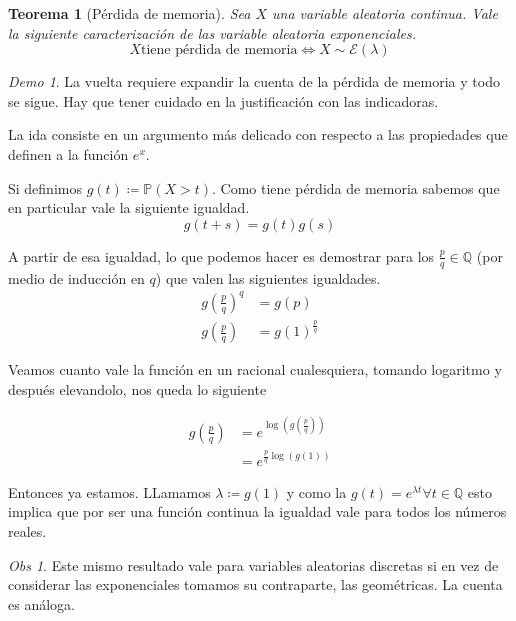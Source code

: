 \documentclass[11pt]{article}
\theoremstyle{plain} %
\newtheorem{teorema}{Teorema}
\theoremstyle{definition}
\theoremstyle{remark}
\newtheorem{obs}{Obs}
\newtheorem*{demo}{Demo}
\def\Q{\mathbb{Q}}
\def\P{\mathbb{P}}
\def\va{variable aleatoria }
\def\vas{variables aleatorias }
\renewcommand\qed{\ding{110}}
\begin{document}
\begin{teorema}
	[P\'erdida de memoria]
	Sea $X$ una \va continua. Vale la siguiente caracterizaci\'on de las \va exponenciales.
	\[X \text{tiene p\'erdida de memoria} \iff X \sim \mathcal{E}(\lambda) \]
\end{teorema}

\begin{demo}
	
	La vuelta requiere expandir la cuenta de la p\'erdida de memoria y todo se sigue. Hay que tener cuidado en la justificaci\'on con las indicadoras.
	
	La ida consiste en un argumento m\'as delicado con respecto a las propiedades que definen a la funci\'on $e^x$. 
	
	Si definimos $g(t) \coloneqq \P(X>t) $. Como tiene p\'erdida de memoria sabemos que en particular vale la siguiente igualdad.
	\[g(t+s) = g(t)g(s)\]
	
	A partir de esa igualdad, lo que podemos hacer es demostrar para los $\frac{p}{q} \in \Q$ (por medio de inducci\'on en $q$) que valen las siguientes igualdades.
	\begin{align*}
		g(\frac{p}{q})^q &= g(p) \\
		g(\frac{p}{q}) &= g(1)^{\frac{p}{q}}
	\end{align*} 
	
	Veamos cuanto vale la funci\'on en un racional cualesquiera, tomando logaritmo y despu\'es elevandolo, nos queda lo siguiente
	
	\begin{align*}
		g(\frac{p}{q}) &= e^{\log(g(\frac{p}{q}))} \\
		&= e^{\frac{p}{q} \log(g(1))} 
	\end{align*}
	
	Entonces ya estamos. LLamamos $\lambda \coloneqq g(1)$ y como la $g(t) = e^{\lambda t} \forall t \in \Q$ esto implica que por ser una funci\'on continua la igualdad vale para todos los n\'umeros reales.
	
	\qed
		
	
\end{demo}

\begin{obs}
	Este mismo resultado vale para \vas discretas si en vez de considerar las exponenciales tomamos su contraparte, las geom\'etricas. La cuenta es an\'aloga.
\end{obs}



\bigskip
\end{document}
